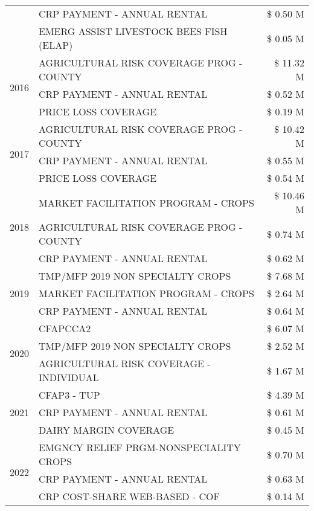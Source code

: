 \begin{tabular}{llr}
 & CRP PAYMENT - ANNUAL RENTAL & \$ 0.50 M \\
 & EMERG ASSIST LIVESTOCK BEES FISH (ELAP) & \$ 0.05 M \\
\cline{1-3}
\multirow[t]{3}{*}{2016} & AGRICULTURAL RISK COVERAGE PROG - COUNTY & \$ 11.32 M \\
 & CRP PAYMENT - ANNUAL RENTAL & \$ 0.52 M \\
 & PRICE LOSS COVERAGE & \$ 0.19 M \\
\cline{1-3}
\multirow[t]{3}{*}{2017} & AGRICULTURAL RISK COVERAGE PROG - COUNTY & \$ 10.42 M \\
 & CRP PAYMENT - ANNUAL RENTAL & \$ 0.55 M \\
 & PRICE LOSS COVERAGE & \$ 0.54 M \\
\cline{1-3}
\multirow[t]{3}{*}{2018} & MARKET FACILITATION PROGRAM - CROPS & \$ 10.46 M \\
 & AGRICULTURAL RISK COVERAGE PROG - COUNTY & \$ 0.74 M \\
 & CRP PAYMENT - ANNUAL RENTAL & \$ 0.62 M \\
\cline{1-3}
\multirow[t]{3}{*}{2019} & TMP/MFP 2019 NON SPECIALTY CROPS & \$ 7.68 M \\
 & MARKET FACILITATION PROGRAM - CROPS & \$ 2.64 M \\
 & CRP PAYMENT - ANNUAL RENTAL & \$ 0.64 M \\
\cline{1-3}
\multirow[t]{3}{*}{2020} & CFAPCCA2 & \$ 6.07 M \\
 & TMP/MFP 2019 NON SPECIALTY CROPS & \$ 2.52 M \\
 & AGRICULTURAL RISK COVERAGE - INDIVIDUAL & \$ 1.67 M \\
\cline{1-3}
\multirow[t]{3}{*}{2021} & CFAP3 - TUP & \$ 4.39 M \\
 & CRP PAYMENT - ANNUAL RENTAL & \$ 0.61 M \\
 & DAIRY MARGIN COVERAGE & \$ 0.45 M \\
\cline{1-3}
\multirow[t]{3}{*}{2022} & EMGNCY RELIEF PRGM-NONSPECIALITY CROPS & \$ 0.70 M \\
 & CRP PAYMENT - ANNUAL RENTAL & \$ 0.63 M \\
 & CRP COST-SHARE WEB-BASED - COF & \$ 0.14 M \\
\cline{1-3}
\bottomrule
\end{tabular}
